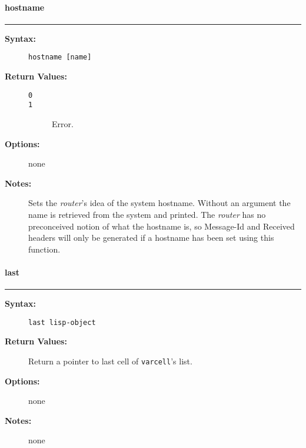 \vspace {2pt}


\paragraph{hostname}

\hrule
\begin{description}
\item[{\bf Syntax:}] \mbox{}

{\tt hostname [name]}

\item[{\bf Return Values:}] \mbox{}

\begin{description}
\item[{\tt 0}] \mbox{}



\item[{\tt 1}] \mbox{}

Error.

\end{description}


\item[{\bf Options:}] \mbox{}

none  

\item[{\bf Notes:}] \mbox{}

Sets the {\em router\/}'s idea of the
system hostname. Without an argument the name is retrieved from
the system and printed. The {\em router\/} has no preconceived 
notion of what the hostname is, so Message-Id and Received headers 
will only be generated if a hostname has been set using this function.

\end{description}


\vspace {2pt}


\paragraph{last}

\hrule
\begin{description}
\item[{\bf Syntax:}] \mbox{}

{\tt last lisp-object}

\item[{\bf Return Values:}] \mbox{}

Return a pointer to last cell of 
{\tt varcell}'s list.

\item[{\bf Options:}] \mbox{}

none  

\item[{\bf Notes:}] \mbox{}

none

\end{description}


